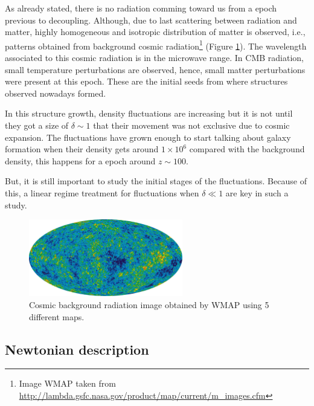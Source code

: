 As already stated, there is no radiation comming toward us from a epoch 
previous to decoupling. Although, due to last scattering between radiation
and matter, highly homogeneous and isotropic distribution of matter is
observed, i.e., patterns obtained from background cosmic radiation\footnote{
Image WMAP taken from \url{http://lambda.gsfc.nasa.gov/product/map/current/m_images.cfm}} (Figure \ref{CMB}).  
The wavelength associated to this cosmic radiation is in the microwave range.
In CMB radiation, small temperature perturbations are observed, hence, small matter
perturbations were present at this epoch. These are the initial seeds from where 
structures observed nowadays formed. 

In this structure growth, density fluctuations are increasing but it is not
until they got a size of $\delta\sim 1$ that their movement was not exclusive
due to cosmic expansion. The fluctuations have grown enough to start talking 
about galaxy formation when their density gets around $1\times 10^6$ compared with
the background density, this happens for a epoch around $z\sim 100$.

But, it is still important to study the initial stages of the fluctuations.
Because of this, a linear regime treatment for fluctuations when $\delta\ll 1$
are key in such a study. 

\begin{figure}[htbp]
       \centering
               \includegraphics[width=0.6\textwidth]{Images/chapter2/CMB.png}
       \caption{\small Cosmic background radiation image obtained by WMAP 
       using 5 different maps.}
       \label{CMB}
 \end{figure}


\subsection{ Newtonian description  }


